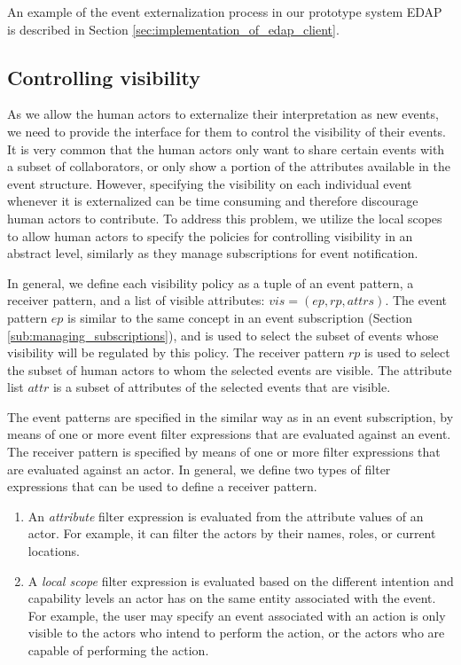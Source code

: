 An example of the event externalization process in our prototype system EDAP is described in Section \ref{sec:implementation_of_edap_client}. 


\subsection{Controlling visibility} %
\label{sub:controlling_visibility}
As we allow the human actors to externalize their interpretation as new events, we need to provide the interface for them to control the visibility of their events. It is very common that the human actors only want to share certain events with a subset of collaborators, or only show a portion of the attributes available in the event structure. However, specifying the visibility on each individual event whenever it is externalized can be time consuming and therefore discourage human actors to contribute. To address this problem, we utilize the local scopes to allow human actors to specify the policies for controlling visibility in an abstract level, similarly as they manage subscriptions for event notification.

In general, we define each visibility policy as a tuple of an event pattern, a receiver pattern, and a list of visible attributes: $vis = (ep, rp, attrs)$. The event pattern $ep$ is similar to the same concept in an event subscription (Section \ref{sub:managing_subscriptions}), and is used to select the subset of events whose visibility will be regulated by this policy. The receiver pattern $rp$ is used to select the subset of human actors to whom the selected events are visible. The attribute list $attr$ is a subset of attributes of the selected events that are visible.

The event patterns are specified in the similar way as in an event subscription, by means of one or more event filter expressions that are evaluated against an event. The receiver pattern is specified by means of one or more filter expressions that are evaluated against an actor. In general, we define two types of filter expressions that can be used to define a receiver pattern.

\begin{enumerate}
	\item An \emph{attribute} filter expression is evaluated from the attribute values of an actor. For example, it can filter the actors by their names, roles, or current locations.
	\item A \emph{local scope} filter expression is evaluated based on the different intention and capability levels an actor has on the same entity associated with the event. For example, the user may specify an event associated with an action is only visible to the actors who intend to perform the action, or the actors who are capable of performing the action.
\end{enumerate}

